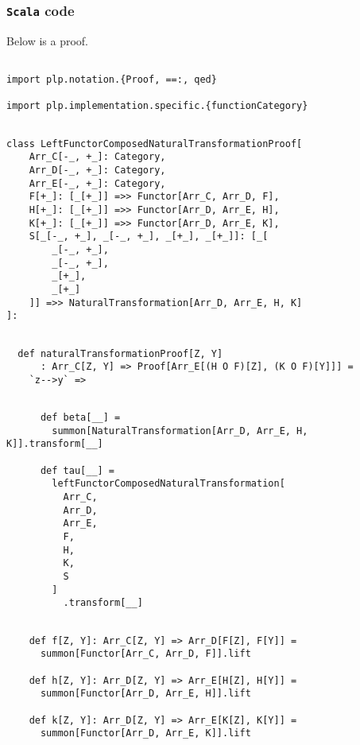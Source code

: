 \documentclass[11pt]{article}
\newcommand{\code}{\subsubsection{{\tt Scala} code}\begingroup\rm \vspace{12pt}}
\begin{document}
\code
Below is a proof.

\vspace{6pt}
\begin{mdframed}[backgroundcolor=lightgray!20] 
\begin{lstlisting}

import plp.notation.{Proof, ==:, qed}

import plp.implementation.specific.{functionCategory}
\end{lstlisting}
\end{mdframed}
\vspace{6pt}
\begin{mdframed}[backgroundcolor=lightgray!20] 
\begin{lstlisting}

class LeftFunctorComposedNaturalTransformationProof[
    Arr_C[-_, +_]: Category,
    Arr_D[-_, +_]: Category,
    Arr_E[-_, +_]: Category,
    F[+_]: [_[+_]] =>> Functor[Arr_C, Arr_D, F],
    H[+_]: [_[+_]] =>> Functor[Arr_D, Arr_E, H],
    K[+_]: [_[+_]] =>> Functor[Arr_D, Arr_E, K],
    S[_[-_, +_], _[-_, +_], _[+_], _[+_]]: [_[
        _[-_, +_],
        _[-_, +_],
        _[+_],
        _[+_]
    ]] =>> NaturalTransformation[Arr_D, Arr_E, H, K]
]:
\end{lstlisting}
\end{mdframed}
\vspace{6pt}
\begin{mdframed}[backgroundcolor=lightgray!20] 
\begin{lstlisting}
  
  def naturalTransformationProof[Z, Y]
      : Arr_C[Z, Y] => Proof[Arr_E[(H O F)[Z], (K O F)[Y]]] =
    `z-->y` =>
\end{lstlisting}
\end{mdframed}
\vspace{6pt}
\begin{mdframed}[backgroundcolor=lightgray!20] 
\begin{lstlisting}

      def beta[__] =
        summon[NaturalTransformation[Arr_D, Arr_E, H, K]].transform[__]

      def tau[__] =
        leftFunctorComposedNaturalTransformation[
          Arr_C,
          Arr_D,
          Arr_E,
          F,
          H,
          K,
          S
        ]
          .transform[__]
\end{lstlisting}
\end{mdframed}
\vspace{6pt}
\clearpage
\begin{mdframed}[backgroundcolor=lightgray!20] 
\begin{lstlisting}

    def f[Z, Y]: Arr_C[Z, Y] => Arr_D[F[Z], F[Y]] =
      summon[Functor[Arr_C, Arr_D, F]].lift

    def h[Z, Y]: Arr_D[Z, Y] => Arr_E[H[Z], H[Y]] =
      summon[Functor[Arr_D, Arr_E, H]].lift

    def k[Z, Y]: Arr_D[Z, Y] => Arr_E[K[Z], K[Y]] =
      summon[Functor[Arr_D, Arr_E, K]].lift
\end{lstlisting}
\end{mdframed}
\end{document}
